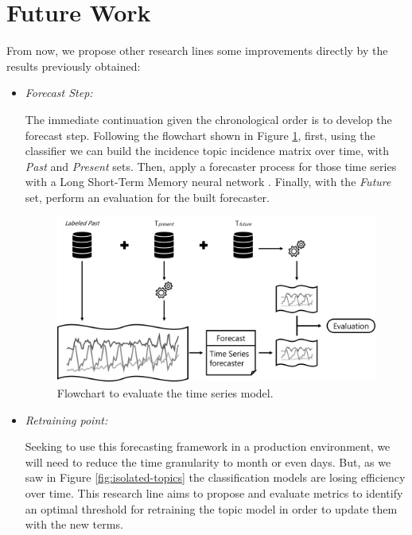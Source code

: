 \section{Future Work}

From now, we propose other research lines some improvements directly by the results previously obtained:

\begin{itemize}
	\item \textit{Forecast Step:}
	
	The immediate continuation given the chronological order is to develop the forecast step. Following the flowchart shown in Figure \ref{fig:forecast}, first, using the classifier we can build the incidence topic incidence matrix over time, with \textit{Past} and \textit{Present} sets. Then, apply a forecaster process for those time series with a Long Short-Term Memory neural network \cite{hochreiter1997long}. Finally, with the \textit{Future} set, perform an evaluation for the built forecaster.
	
	\begin{figure}[h!]
		\centering
		\includegraphics[width=0.8\linewidth]{01.Chapters/04.Materials/forecast}
		\caption{Flowchart to evaluate the time series model.}
		\label{fig:forecast}
	\end{figure}
	
	\item \textit{Retraining point:}
	
	Seeking to use this forecasting framework in a production environment, we will need to reduce the time granularity to month or even days. But, as we saw in Figure \ref{fig:isolated-topics} the classification models are losing efficiency over time. This research line aims to propose and evaluate metrics to identify an optimal threshold for retraining the topic model in order to update them with the new terms.
	
	

\end{itemize}

